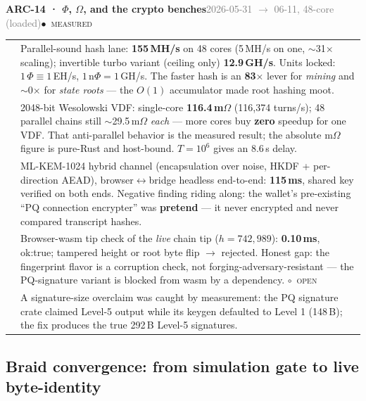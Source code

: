\documentclass[10pt,a4paper]{article}
\makeatletter
\newcommand{\stM}{\textcolor{sigilcyan}{$\bullet$}~{\scriptsize\textcolor{sigilcyan}{\textsc{measured}}}}
\newcommand{\stO}{\textcolor{sigilamber}{$\circ$}~{\scriptsize\textcolor{sigilamber}{\textsc{open}}}}
\newcommand{\measured}[1]{\textcolor{sigilcyan}{\textbf{#1}}}
\newcommand{\frow}[2]{{\footnotesize\textcolor{gray}{\textsc{#1}}}\;&\small #2\\}
\newenvironment{mentry}[4]{%
\begin{tcolorbox}[enhanced,breakable,colback=white,colframe=slate,boxrule=0.6pt,arc=2pt,
  left=8pt,right=8pt,top=6pt,bottom=6pt,
  borderline west={3pt}{0pt}{sigilcyan!70!slate}]
{\small\textbf{#1 · #2}\hfill{\footnotesize\textcolor{gray}{#3}}\quad#4}\\[4pt]
\begin{tabular}{@{}>{\raggedleft\arraybackslash}p{1.8cm}p{13.2cm}@{}}
}{%
\end{tabular}
\end{tcolorbox}\vspace{2pt}}
\makeatother
\begin{document}
\begin{mentry}{ARC-14}{$\Phi$, $\Omega$, and the crypto benches}{2026-05-31 $\to$ 06-11, 48-core (loaded)}{\stM}
\frow{hash}{Parallel-sound hash lane: \measured{155\,MH/s} on 48 cores (5\,MH/s on one,
$\sim$31$\times$ scaling); invertible turbo variant (ceiling only) \measured{12.9\,GH/s}.
Units locked: $1\,\Phi \equiv 1$\,EH/s, $1\,\mathrm{n}\Phi = 1$\,GH/s. The faster hash is
an \measured{83$\times$} lever for \emph{mining} and $\sim$0$\times$ for \emph{state
roots} --- the $O(1)$ accumulator made root hashing moot.}
\frow{vdf}{2048-bit Wesolowski VDF: single-core \measured{116.4\,m$\Omega$}
(116{,}374 turns/s); 48 parallel chains still $\sim$29.5\,m$\Omega$ \emph{each} --- more
cores buy \textbf{zero} speedup for one VDF. That anti-parallel behavior is the measured
result; the absolute m$\Omega$ figure is pure-Rust and host-bound. $T=10^{6}$ gives an
8.6\,s delay.}
\frow{pq}{ML-KEM-1024 hybrid channel (encapsulation over noise, HKDF + per-direction
AEAD), browser$\leftrightarrow$bridge headless end-to-end: \measured{115\,ms}, shared key
verified on both ends. Negative finding riding along: the wallet's pre-existing
``PQ connection encrypter'' was \textbf{pretend} --- it never encrypted and never compared
transcript hashes.}
\frow{tip}{Browser-wasm tip check of the \emph{live} chain tip ($h=742{,}989$):
\measured{0.10\,ms}, ok:true; tampered height or root byte flip $\to$ rejected. Honest
gap: the fingerprint flavor is a corruption check, not forging-adversary-resistant ---
the PQ-signature variant is blocked from wasm by a dependency. \stO}
\frow{calibration}{A signature-size overclaim was caught by measurement: the PQ signature
crate claimed Level-5 output while its keygen defaulted to Level 1 (148\,B); the fix
produces the true 292\,B Level-5 signatures.}
\end{mentry}

\subsection{Braid convergence: from simulation gate to live byte-identity}
\end{document}

